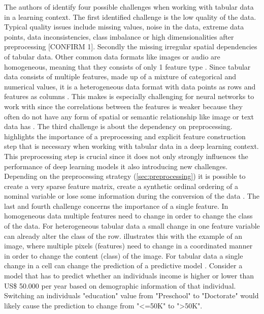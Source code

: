 The authors of \cite{borisov2022DeepNeuralNetworks} identify four possible challenges when working with tabular data in a learning context.
The first identified challenge is the low quality of the data. Typical quality issues include missing values, noise in the data, extreme data points, data inconsistencies, class imbalance or high dimensionalities after preprocessing \cite{borisov2022DeepNeuralNetworks}[CONFIRM 1].
Secondly the missing irregular spatial dependencies of tabular data. Other common data formats like images or audio are homogeneous, 
meaning that they consists of only 1 feature type \cite{borisov2022DeepNeuralNetworks}.
Since tabular data consists of multiple features, made up of a mixture of categorical and numerical values, it is a heterogeneous data format with data points as rows and features as columns \cite{borisov2022DeepNeuralNetworks}.
This makes is especially challenging for neural networks to work with since the correlations between the features is weaker because they often do not have any form of spatial or semantic relationship like image or text data has \cite{borisov2022DeepNeuralNetworks, yoon2020VIMEExtendingSuccess}.
The third challenge is about the dependency on preprocessing. \cite{borisov2022DeepNeuralNetworks} highlights the importance of a preprocessing and explicit feature construction step that is necessary when working with tabular data in a deep learning context.
This preprocessing step is crucial since it does not only strongly influences the performance of deep learning models \cite{gorishniy2022EmbeddingsNumericalFeatures} 
it also introducing new challenges. Depending on the preprocessing strategy (\autoref{sec:preprocessing}) it is possible to create a very sparse feature matrix, create a synthetic ordinal ordering of a nominal variable or lose some information during the conversion of the data \cite{borisov2022DeepNeuralNetworks}.
The last and fourth challenge concerns the importance of a single feature. In homogeneous data multiple features need to change in order to change the class of the data. 
For heterogeneous tabular data a small change in one feature variable can already alter the class of the row. 
\cite{borisov2022DeepNeuralNetworks} illustrates this with the example of an image, where multiple pixels (\ie features) need to change in a coordinated manner in order to change the content (\ie class) of the image.
For tabular data a single change in a cell can change the prediction of a predictive model \cite{borisov2022DeepNeuralNetworks}. 
Consider a model that has to predict whether an individuals income is higher or lower than US\$ 50.000 per year \cite{Dua:2019} based on demographic information of that individual.
Switching an individuals "education" value from "Preschool" to "Doctorate" would likely cause the prediction to change from "<=50K" to ">50K".





